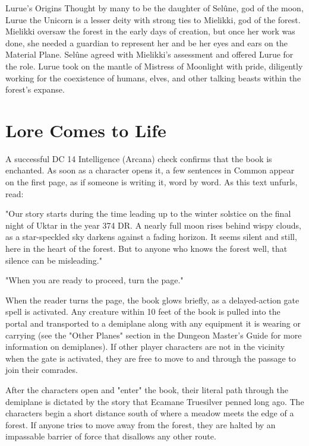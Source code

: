 \documentclass[10pt,a4paper,twoside,bg=print,twocolumn,openany,nodeprecatedcode]{dndbook}
\begin{document}
\begin{DndSidebar}[float=!b]{Lurue's Origins}
Thought by many to be the daughter of Selûne, god of the moon, Lurue the Unicorn is a lesser deity with strong ties to Mielikki, god of the forest. Mielikki oversaw the forest in the early days of creation, but once her work was done, she needed a guardian to represent her and be her eyes and ears on the Material Plane. Selûne agreed with Mielikki's assessment and offered Lurue for the role. Lurue took on the mantle of Mistress of Moonlight with pride, diligently working for the coexistence of humans, elves, and other talking beasts within the forest's expanse.



\end{DndSidebar}

\section{Lore Comes to Life}
A successful DC 14 Intelligence (Arcana) check confirms that the book is enchanted. As soon as a character opens it, a few sentences in Common appear on the first page, as if someone is writing it, word by word. As this text unfurls, read:

\begin{DndReadAloud}{}
"Our story starts during the time leading up to the winter solstice on the final night of Uktar in the year 374 DR. A nearly full moon rises behind wispy clouds, as a star-speckled sky darkens against a fading horizon. It seems silent and still, here in the heart of the forest. But to anyone who knows the forest well, that silence can be misleading."

"When you are ready to proceed, turn the page."

\end{DndReadAloud}

When the reader turns the page, the book glows briefly, as a delayed-action gate spell is activated. Any creature within 10 feet of the book is pulled into the portal and transported to a demiplane along with any equipment it is wearing or carrying (see the "Other Planes" section in the Dungeon Master's Guide for more information on demiplanes). If other player characters are not in the vicinity when the gate is activated, they are free to move to and through the passage to join their comrades.

After the characters open and "enter" the book, their literal path through the demiplane is dictated by the story that Ecamane Truesilver penned long ago. The characters begin a short distance south of where a meadow meets the edge of a forest. If anyone tries to move away from the forest, they are halted by an impassable barrier of force that disallows any other route.
\end{document}
